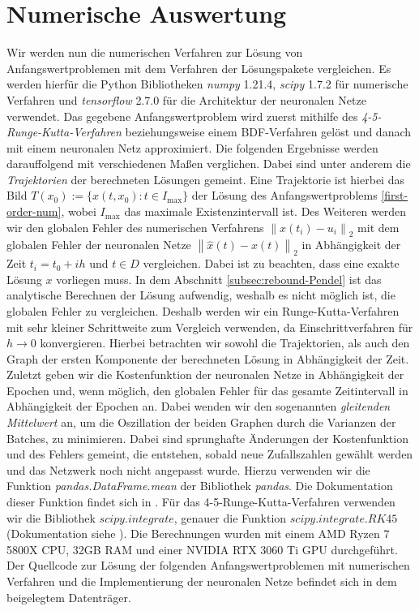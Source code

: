 \section{Numerische Auswertung}
\label{sec:verfahrensvergleich}
Wir werden nun die numerischen Verfahren zur Lösung von Anfangswertproblemen mit dem Verfahren der Lösungspakete
vergleichen. Es werden hierfür die Python Bibliotheken \textit{numpy} 1.21.4, \textit{scipy} 1.7.2 für numerische
Verfahren und \textit{tensorflow} 2.7.0 für die Architektur der neuronalen Netze verwendet. Das gegebene
Anfangswertproblem wird zuerst mithilfe des \textit{4-5-Runge-Kutta-Verfahren} beziehungsweise einem BDF-Verfahren
gelöst und danach mit einem neuronalen Netz approximiert. Die folgenden Ergebnisse werden darauffolgend mit
verschiedenen Maßen verglichen. Dabei sind unter anderem die \textit{Trajektorien} der berechneten Lösungen gemeint.
Eine Trajektorie ist hierbei das Bild $T(x_0):= \{x(t,x_0): t\in I_{\text{max}}\}$ der Lösung des Anfangswertproblems
\eqref{first-order-num}, wobei $I_{\text{max}}$ das maximale Existenzintervall ist. Des Weiteren werden wir den globalen
Fehler des numerischen Verfahrens $\left\lVert x(t_i) - u_i \right\rVert_2$ mit dem globalen Fehler der neuronalen Netze
$\left\lVert \hat{x}(t) - x(t) \right\rVert_2$ in Abhängigkeit der Zeit $t_i=t_0 + ih$ und $t\in D$ vergleichen. Dabei
ist zu beachten, dass eine exakte Lösung $x$ vorliegen muss. In dem Abschnitt \ref{subsec:rebound-Pendel} ist das
analytische Berechnen der Lösung aufwendig, weshalb es nicht möglich ist, die globalen Fehler zu vergleichen. Deshalb
werden wir ein Runge-Kutta-Verfahren mit sehr kleiner Schrittweite zum Vergleich verwenden, da Einschrittverfahren für
$h \rightarrow 0$ konvergieren. Hierbei betrachten wir sowohl die Trajektorien, als auch den Graph der ersten Komponente
der berechneten Lösung in Abhängigkeit der Zeit.
Zuletzt geben wir die Kostenfunktion der neuronalen Netze in Abhängigkeit der Epochen und, wenn möglich, den globalen
Fehler für das gesamte Zeitintervall in Abhängigkeit der Epochen an. Dabei wenden wir den sogenannten
\textit{gleitenden Mittelwert} an, um die Oszillation der beiden Graphen durch die Varianzen der Batches, zu
minimieren. Dabei sind sprunghafte Änderungen der Kostenfunktion und des Fehlers gemeint, die entstehen, sobald neue
Zufallszahlen gewählt werden und das Netzwerk noch nicht angepasst wurde. Hierzu verwenden wir die Funktion
\textit{pandas.DataFrame.mean} der Bibliothek \textit{pandas}. Die Dokumentation dieser Funktion findet sich in
\cite{PandasDataFrameMean}. Für das 4-5-Runge-Kutta-Verfahren verwenden wir die Bibliothek $scipy.integrate$, genauer
die Funktion $scipy.integrate.RK45$ (Dokumentation siehe \cite{ScipyIntegrateRK45}). Die Berechnungen wurden mit einem
AMD Ryzen 7 5800X CPU, 32GB RAM und einer NVIDIA RTX 3060 Ti GPU durchgeführt. Der Quellcode zur Lösung der folgenden
Anfangswertproblemen mit numerischen Verfahren und die Implementierung der neuronalen Netze befindet sich in dem
beigelegtem Datenträger.


